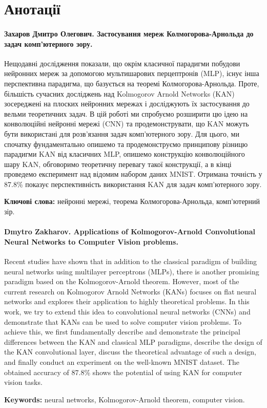 \chapter*{Анотації}

\subsubsection{Захаров Дмитро Олегович. Застосування мереж Колмогорова-Арнольда до задач комп'ютерного зору.}

Нещодавні дослідження показали, що окрім класичної парадигми побудови нейронних
мереж за допомогою мультишарових перцептронів (MLP), існує інша перспективна
парадигма, що базується на теоремі Колмогорова-Арнольда. Проте, більшість
сучасних досліджень над Kolmogorov Arnold Networks (KAN) зосереджені на плоских
нейронних мережах і досліджують їх застосування до вельми теоретичних задач. В
цій роботі ми спробуємо розширити цю ідею на конволюційні нейронні мережі (CNN)
та продемонструвати, що KAN можуть бути використані для розв'язання задач
комп'ютерного зору. Для цього, ми спочатку фундаментально опишемо та 
продемонструємо принципову різницю парадигми KAN від класичних MLP, 
опишемо конструкцію конволюційного шару KAN, обговоримо теоретичну 
перевагу такої конструкції, а в кінці проведемо експеримент над 
відомим набором даних MNIST. Отримана точність у 87.8\% показує
перспективність використання KAN для задач комп'ютерного зору.

\textbf{Ключові слова:} нейронні мережі, теорема Колмогорова-Арнольда, комп'ютерний зір.


\subsubsection{Dmytro Zakharov. Applications of Kolmogorov-Arnold Convolutional Neural Networks to Computer Vision problems.}

Recent studies have shown that in addition to the classical paradigm of building
neural networks using multilayer perceptrons (MLPs), there is another promising
paradigm based on the Kolmogorov-Arnold theorem. However, most of the current
research on Kolmogorov Arnold Networks (KANs) focuses on flat neural networks
and explores their application to highly theoretical problems. In this work, we
try to extend this idea to convolutional neural networks (CNNs) and demonstrate
that KANs can be used to solve computer vision problems. To achieve this, we
first fundamentally describe and demonstrate the principal differences between
the KAN and classical MLP paradigms, describe the design of the KAN
convolutional layer, discuss the theoretical advantage of such a design, and
finally conduct an experiment on the well-known MNIST dataset. The obtained
accuracy of 87.8\% shows the potential of using KAN for computer vision tasks.

\textbf{Keywords:} neural networks, Kolmogorov-Arnold theorem, computer vision.
